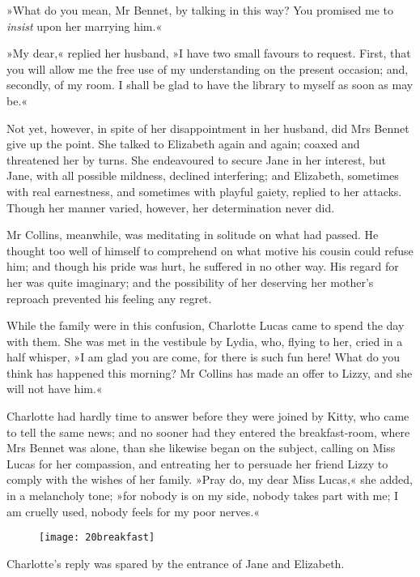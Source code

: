 »What do you mean, Mr Bennet, by talking in this way? You promised me to \textit{insist} upon her marrying him.«

»My dear,« replied her husband, »I have two small favours to request. First, that you will allow me the free use of my understanding on the present occasion; and, secondly, of my room. I shall be glad to have the library to myself as soon as may be.«

Not yet, however, in spite of her disappointment in her husband, did Mrs Bennet give up the point. She talked to Elizabeth again and again; coaxed and threatened her by turns. She endeavoured to secure Jane in her interest, but Jane, with all possible mildness, declined interfering; and Elizabeth, sometimes with real earnestness, and sometimes with playful gaiety, replied to her attacks. Though her manner varied, however, her determination never did.

Mr Collins, meanwhile, was meditating in solitude on what had passed. He thought too well of himself to comprehend on what motive his cousin could refuse him; and though his pride was hurt, he suffered in no other way. His regard for her was quite imaginary; and the possibility of her deserving her mother's reproach prevented his feeling any regret.

While the family were in this confusion, Charlotte Lucas came to spend the day with them. She was met in the vestibule by Lydia, who, flying to her, cried in a half whisper, »I am glad you are come, for there is such fun here! What do you think has happened this morning? Mr Collins has made an offer to Lizzy, and she will not have him.«

Charlotte had hardly time to answer before they were joined by Kitty, who came to tell the same news; and no sooner had they entered the breakfast-room, where Mrs Bennet was alone, than she likewise began on the subject, calling on Miss Lucas for her compassion, and entreating her to persuade her friend Lizzy to comply with the wishes of her family. »Pray do, my dear Miss Lucas,« she added, in a melancholy tone; »for nobody is on my side, nobody takes part with me; I am cruelly used, nobody feels for my poor nerves.«

\begin{figure}[tbh]
\centering
\texttt{[image: 20breakfast]}
\end{figure}

Charlotte's reply was spared by the entrance of Jane and Elizabeth.

